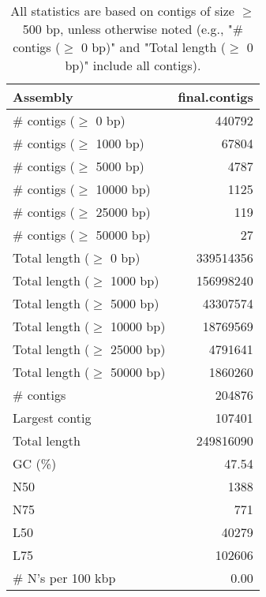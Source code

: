 \documentclass[12pt,a4paper]{article}
\begin{document}
\begin{table}[ht]
\begin{center}
\caption{All statistics are based on contigs of size $\geq$ 500 bp, unless otherwise noted (e.g., "\# contigs ($\geq$ 0 bp)" and "Total length ($\geq$ 0 bp)" include all contigs).}
\begin{tabular}{|l*{1}{|r}|}
\hline
Assembly & final.contigs \\ \hline
\# contigs ($\geq$ 0 bp) & 440792 \\ \hline
\# contigs ($\geq$ 1000 bp) & 67804 \\ \hline
\# contigs ($\geq$ 5000 bp) & 4787 \\ \hline
\# contigs ($\geq$ 10000 bp) & 1125 \\ \hline
\# contigs ($\geq$ 25000 bp) & 119 \\ \hline
\# contigs ($\geq$ 50000 bp) & 27 \\ \hline
Total length ($\geq$ 0 bp) & 339514356 \\ \hline
Total length ($\geq$ 1000 bp) & 156998240 \\ \hline
Total length ($\geq$ 5000 bp) & 43307574 \\ \hline
Total length ($\geq$ 10000 bp) & 18769569 \\ \hline
Total length ($\geq$ 25000 bp) & 4791641 \\ \hline
Total length ($\geq$ 50000 bp) & 1860260 \\ \hline
\# contigs & 204876 \\ \hline
Largest contig & 107401 \\ \hline
Total length & 249816090 \\ \hline
GC (\%) & 47.54 \\ \hline
N50 & 1388 \\ \hline
N75 & 771 \\ \hline
L50 & 40279 \\ \hline
L75 & 102606 \\ \hline
\# N's per 100 kbp & 0.00 \\ \hline
\end{tabular}
\end{center}
\end{table}
\end{document}
